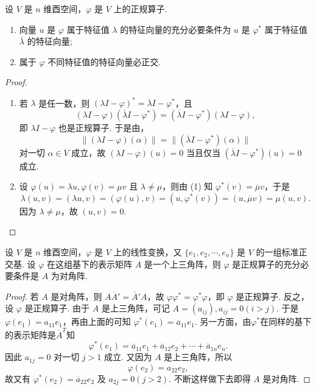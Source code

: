 \documentclass[../../main.tex]{subfiles}%
\begin{document}
\begin{proposition}\label{proposition:正规算子的特征值与特征向量的相关性质-例9.28}
设 $V$ 是 $n$ 维酉空间，$\varphi$ 是 $V$ 上的正规算子.
\begin{enumerate}[(1)]
\item 向量 $u$ 是 $\varphi$ 属于特征值 $\lambda$ 的特征向量的充分必要条件为 $u$ 是 $\varphi^*$ 属于特征值 $\overline{\lambda}$ 的特征向量;

\item 属于 $\varphi$ 不同特征值的特征向量必正交.
\end{enumerate}
\end{proposition}
\begin{proof}
\begin{enumerate}[(1)]
\item 若 $\lambda$ 是任一数，则 $(\lambda I - \varphi)^* = \overline{\lambda}I - \varphi^*$，且
\[
(\lambda I - \varphi)(\overline{\lambda}I - \varphi^*) = (\overline{\lambda}I - \varphi^*)(\lambda I - \varphi),
\]
即 $\lambda I - \varphi$ 也是正规算子. 于是由，
\[
\|(\lambda I - \varphi)(\alpha)\| = \|(\overline{\lambda}I - \varphi^*)(\alpha)\|
\]
对一切 $\alpha \in V$ 成立，故 $(\lambda I - \varphi)(u) = 0$ 当且仅当 $(\overline{\lambda}I - \varphi^*)(u) = 0$ 成立.

\item 设 $\varphi(u) = \lambda u, \varphi(v) = \mu v$ 且 $\lambda \neq \mu$，则由 (1) 知 $\varphi^*(v) = \overline{\mu}v$，于是
\[
\lambda(u,v) = (\lambda u,v) = (\varphi(u),v) = (u,\varphi^*(v)) = (u,\overline{\mu}v) = \mu(u,v).
\]
因为 $\lambda \neq \mu$，故 $(u,v) = 0$. 
\end{enumerate}

\end{proof}

\begin{lemma}\label{lemma:表示矩阵是上三角阵的正规算子表示矩阵必是对角阵}
设 $V$ 是 $n$ 维酉空间，$\varphi$ 是 $V$ 上的线性变换，又 $\{e_1,e_2,\cdots,e_n\}$ 是 $V$ 的一组标准正交基. 设 $\varphi$ 在这组基下的表示矩阵 $A$ 是一个上三角阵，则 $\varphi$ 是正规算子的充分必要条件是 $A$ 为对角阵.
\end{lemma}
\begin{proof}

若 $A$ 是对角阵，则 $A\overline{A}' = \overline{A}'A$，故 $\varphi\varphi^* = \varphi^*\varphi$，即 $\varphi$ 是正规算子. 反之，设 $\varphi$ 是正规算子. 由于 $A$ 是上三角阵，可记 $A = (a_{ij}), a_{ij} = 0 (i > j)$. 于是 $\varphi(e_1) = a_{11}e_1$，再由上面的可知 $\varphi^*(e_1) = \overline{a}_{11}e_1$. 另一方面，由$\varphi^*$在同样的基下的表示矩阵是$\overline{A}^T$知
\[
\varphi^*(e_1) = \overline{a}_{11}e_1 + \overline{a}_{12}e_2 + \cdots + \overline{a}_{1n}e_n.
\]
因此 $a_{1j} = 0$ 对一切 $j > 1$ 成立. 又因为 $A$ 是上三角阵，所以
\[
\varphi(e_2) = a_{22}e_2,
\]
故又有 $\varphi^*(e_2) = \overline{a}_{22}e_2$ 及 $a_{2j} = 0 (j > 2)$. 不断这样做下去即得 $A$ 是对角阵.

\end{proof}
\end{document}
